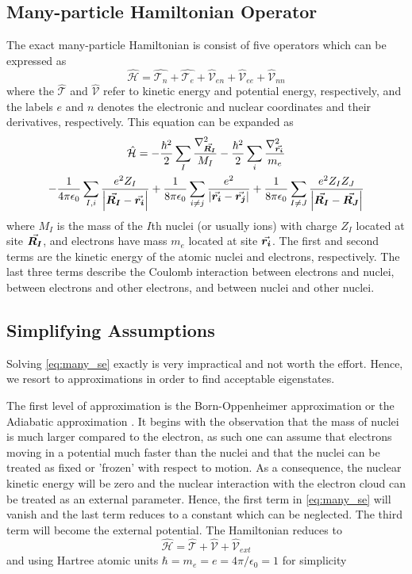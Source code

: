 \subsection{Many-particle Hamiltonian Operator}
The exact many-particle Hamiltonian is consist of five operators which can be expressed as
\begin{equation}
	\hat{\mathcal{H}} = \hat{\mathcal{T}_n} + \hat{\mathcal{T}_e} + \hat{\mathcal{V}}_{en} + \hat{\mathcal{V}}_{ee}  + \hat{\mathcal{V}}_{nn}
\end{equation}
where the $\hat{\mathcal{T}}$ and $\hat{\mathcal{V}}$ refer to kinetic energy and potential energy, respectively, and the labels $e$ and $n$ denotes the electronic and nuclear coordinates and their derivatives, respectively.  This equation can be expanded as
\begin{multline} \label{eq:many_se}
	\hat{\mathcal{H}}  = - \frac{\hbar^2}{2} \sum_I \frac{\laplacian_{\va*{R_I}}}{M_I} - \frac{\hbar^2}{2} \sum_i \frac{\laplacian_{\va*{r_i}}}{m_e} \\
	- \frac{1}{4 \pi \epsilon_0} \sum_{I,i} \frac{e^2 Z_I}{\abs{\va*{R_I} - \va*{r_i}}} + \frac{1}{8 \pi \epsilon_0} \sum_{i\neq j} \frac{e^2}{\abs{\va*{r_i} - \va*{r_j}}} + \frac{1}{8 \pi \epsilon_0} \sum_{I\neq J} \frac{e^2 Z_I Z_J}{\abs{\va*{R_I} - \va*{R_J}}}
\end{multline}
where $M_I$ is the mass of the $I$th nuclei (or usually ions) with charge $Z_I$ located at site $\va*{R_I}$, and electrons have mass $m_e$  located at site $\va*{r_i}$. The first and second terms are the kinetic energy of the atomic nuclei and electrons, respectively. The last three terms
describe the Coulomb interaction between electrons and nuclei, between electrons and other electrons, and between nuclei and other nuclei.

\subsection{Simplifying Assumptions}
Solving \eqref{eq:many_se} exactly is very impractical and not worth the effort. Hence, we resort to approximations in order to find acceptable eigenstates.

The first level of approximation is the Born-Oppenheimer approximation or the Adiabatic approximation \citep{Born1927}. It begins with the observation that the mass of nuclei is much larger compared to the electron, as such one can assume that electrons moving in a potential much faster than the nuclei and that the nuclei can be treated as fixed or 'frozen' with respect to motion. As a consequence, the nuclear kinetic energy will be zero and the nuclear interaction with the electron cloud  can be treated as an external parameter. Hence, the first  term in \eqref{eq:many_se} will vanish and the last term reduces to a constant which can be neglected. The third term will become the external potential. The Hamiltonian reduces to
\begin{equation}
	\hat{\mathcal{H}}  = \hat{\mathcal{T}} + \hat{\mathcal{V}} + \hat{\mathcal{V}}_{ext}
\end{equation}
and using Hartree atomic units $\hbar = m_e = e = 4 \pi / \epsilon_0 =1$ for simplicity

